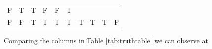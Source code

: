 \documentclass[oneside]{report}
\theoremstyle{definition}
\theoremstyle{definition}
\theoremstyle{definition}
\theoremstyle{remark}
\begin{document}
\begin{longtable}[]{@{}cccccccccc@{}}
\begin{minipage}[t]{0.08\columnwidth}
F\strut
\end{minipage} & \begin{minipage}[t]{0.08\columnwidth}\centering\strut
T\strut
\end{minipage} & \begin{minipage}[t]{0.08\columnwidth}\centering\strut
T\strut
\end{minipage} & \begin{minipage}[t]{0.08\columnwidth}\centering\strut
F\strut
\end{minipage} & \begin{minipage}[t]{0.09\columnwidth}\centering\strut
F\strut
\end{minipage} & \begin{minipage}[t]{0.08\columnwidth}\centering\strut
T\strut
\end{minipage}\tabularnewline
\begin{minipage}[t]{0.04\columnwidth}\centering\strut
F\strut
\end{minipage} & \begin{minipage}[t]{0.04\columnwidth}\centering\strut
F\strut
\end{minipage} & \begin{minipage}[t]{0.04\columnwidth}\centering\strut
T\strut
\end{minipage} & \begin{minipage}[t]{0.04\columnwidth}\centering\strut
T\strut
\end{minipage} & \begin{minipage}[t]{0.08\columnwidth}\centering\strut
T\strut
\end{minipage} & \begin{minipage}[t]{0.08\columnwidth}\centering\strut
T\strut
\end{minipage} & \begin{minipage}[t]{0.08\columnwidth}\centering\strut
T\strut
\end{minipage} & \begin{minipage}[t]{0.08\columnwidth}\centering\strut
T\strut
\end{minipage} & \begin{minipage}[t]{0.09\columnwidth}\centering\strut
T\strut
\end{minipage} & \begin{minipage}[t]{0.08\columnwidth}\centering\strut
F\strut
\end{minipage}\tabularnewline
\bottomrule
\end{longtable}
Comparing the columns in Table \ref{tab:truthtable} we can observe at
\end{document}
